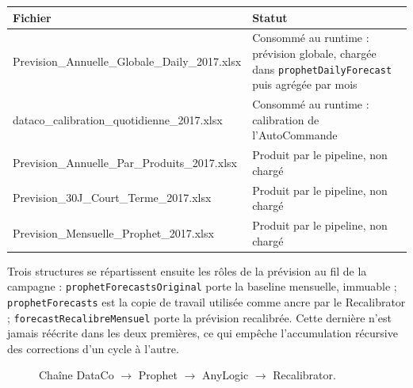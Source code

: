 \documentclass[11pt,a4paper]{article}
\newcommand{\code}[1]{\texttt{#1}}
\begin{document}
\begin{center}
\small
\begin{tabularx}{\textwidth}{>{\ttfamily}p{5.6cm} X}
\toprule
Fichier & Statut \\
\midrule
Prevision\_Annuelle\_\allowbreak Globale\_Daily\_2017.xlsx & Consommé au runtime : prévision globale, chargée dans \code{prophetDailyForecast} puis agrégée par mois \\
dataco\_calibration\_\allowbreak quotidienne\_2017.xlsx & Consommé au runtime : calibration de l'AutoCommande \\
Prevision\_Annuelle\_\allowbreak Par\_Produits\_2017.xlsx & Produit par le pipeline, non chargé \\
Prevision\_30J\_\allowbreak Court\_Terme\_2017.xlsx & Produit par le pipeline, non chargé \\
Prevision\_Mensuelle\_\allowbreak Prophet\_2017.xlsx & Produit par le pipeline, non chargé \\
\bottomrule
\end{tabularx}
\end{center}

Trois structures se répartissent ensuite les rôles de la prévision au fil de la campagne : \code{prophetForecastsOriginal} porte la baseline mensuelle, immuable ; \code{prophetForecasts} est la copie de travail utilisée comme ancre par le Recalibrator ; \code{forecastRecalibreMensuel} porte la prévision recalibrée. Cette dernière n'est jamais réécrite dans les deux premières, ce qui empêche l'accumulation récursive des corrections d'un cycle à l'autre.

\begin{figure}[H]
\centering
{}
\caption{Chaîne DataCo $\to$ Prophet $\to$ AnyLogic $\to$ Recalibrator.}
\label{fig:pipeline}
\end{figure}
\end{document}
